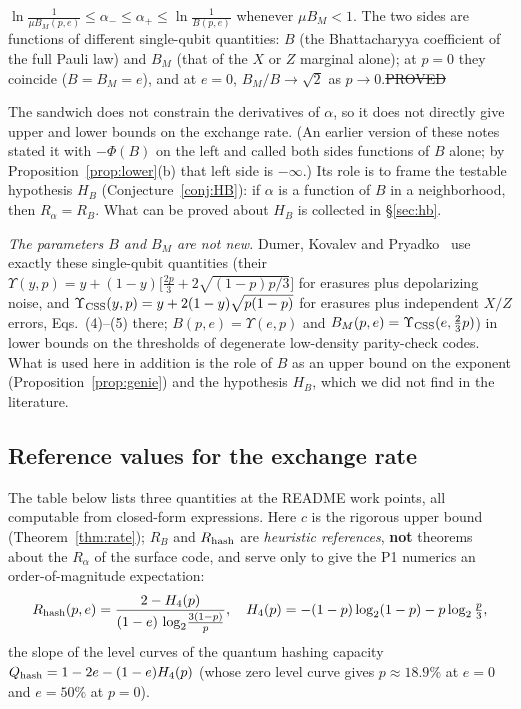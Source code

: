 \begin{corollary}\label{cor:sandwich}
$\ln\frac1{\mu B_M(p,e)}\le\alpha_-\le\alpha_+\le\ln\frac1{B(p,e)}$ whenever $\mu B_M<1$. The two sides are functions of different single-qubit quantities: $B$ (the Bhattacharyya coefficient of the full Pauli law) and $B_M$ (that of the $X$ or $Z$ marginal alone); at $p=0$ they coincide ($B=B_M=e$), and at $e=0$, $B_M/B\to\sqrt2$ as $p\to0$.\hfill\st{PROVED}
\end{corollary}

The sandwich does not constrain the derivatives of $\alpha$, so it does not directly give upper and lower bounds on the exchange rate. (An earlier version of these notes stated it with $-\Phi(B)$ on the left and called both sides functions of $B$ alone; by Proposition~\ref{prop:lower}(b) that left side is $-\infty$.) Its role is to frame the testable hypothesis $H_B$
(Conjecture~\ref{conj:HB}): if $\alpha$ is a function of $B$ in a neighborhood, then $R_\alpha=R_B$. What can be proved about $H_B$ is collected in \S\ref{sec:hb}.

\noindent\emph{The parameters $B$ and $B_M$ are not new.} Dumer, Kovalev and Pryadko~\cite{DKP} use exactly these single-qubit quantities (their $\Upsilon(y,p)=y+(1-y)\big[\tfrac{2p}3+2\sqrt{(1-p)p/3}\big]$ for erasures plus depolarizing noise, and $\Upsilon_{\rm CSS}(y,p)=y+2(1-y)\sqrt{p(1-p)}$ for erasures plus independent $X/Z$ errors, Eqs.~(4)--(5) there; $B(p,e)=\Upsilon(e,p)$ and $B_M(p,e)=\Upsilon_{\rm CSS}(e,\tfrac23p)$) in lower bounds on the thresholds of degenerate low-density parity-check codes. What is used here in addition is the role of $B$ as an upper bound on the exponent (Proposition~\ref{prop:genie}) and the hypothesis $H_B$, which we did not find in the literature.

\subsection{Reference values for the exchange rate}

The table below lists three quantities at the README work points, all computable from closed-form expressions. Here $c$ is the rigorous upper bound (Theorem~\ref{thm:rate});
$R_B$ and $R_{\rm hash}$ are \emph{heuristic references}, \textbf{not} theorems about the $R_\alpha$ of the surface code, and serve only to give the P1 numerics an order-of-magnitude expectation:
\[
R_{\rm hash}(p,e)=\frac{2-H_4(p)}{(1-e)\,\log_2\!\frac{3(1-p)}{p}},\quad
H_4(p)=-(1-p)\log_2(1-p)-p\log_2\tfrac p3,
\]
the slope of the level curves of the quantum hashing capacity $Q_{\rm hash}=1-2e-(1-e)H_4(p)$ (whose zero level curve gives $p\approx18.9\%$ at $e=0$
and $e=50\%$ at $p=0$).

